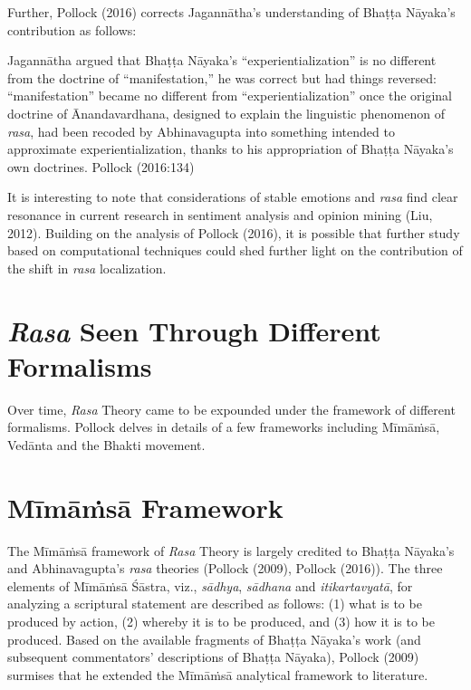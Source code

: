 Further, Pollock (2016) corrects Jagannātha’s understanding of Bhaṭṭa Nāyaka’s contribution as follows:

\begin{myquote}
Jagannātha argued that Bhaṭṭa Nāyaka’s “experientialization” is no different from the doctrine of “manifestation,” he was correct but had things reversed: “manifestation” became no different from “experientialization” once the original doctrine of Ānandavardhana, designed to explain the linguistic phenomenon of \textsl{rasa}, had been recoded by Abhinavagupta into something intended to approximate experientialization, thanks to his appropriation of Bhaṭṭa Nāyaka’s own doctrines.
\hfill Pollock (2016:134)
\end{myquote}

It is interesting to note that considerations of stable emotions and \textsl{rasa} find clear resonance in current research in sentiment analysis and opinion mining (Liu, 2012). Building on the analysis of Pollock (2016), it is possible that further study based on computational techniques could shed further light on the contribution of the shift in \textsl{rasa} localization.\\[-20pt] 

\section*{\textsl{Rasa} Seen Through Different Formalisms}

Over time, \textsl{Rasa} Theory came to be expounded under the framework of different formalisms. Pollock delves in details of a few frameworks including Mīmāṁsā, Vedānta and the Bhakti movement.\\[-20pt]

\section*{Mīmāṁsā Framework}

The Mīmāṁsā framework of \textsl{Rasa} Theory is largely credited to Bhaṭṭa Nāyaka’s and Abhinavagupta’s \textsl{rasa} theories (Pollock (2009), Pollock (2016)). The three elements of Mīmāṁsā Śāstra, viz., \textsl{sādhya}, \textsl{sādhana} and \textsl{itikartavyatā}, for analyzing a scriptural statement are described as follows: (1) what is to be produced by action, (2) whereby it is to be produced, and (3) how it is to be produced. Based on the available fragments of Bhaṭṭa Nāyaka’s work (and subsequent commentators’ descriptions of Bhaṭṭa Nāyaka), Pollock (2009) surmises that he extended the Mīmāṁsā analytical framework to literature. 



